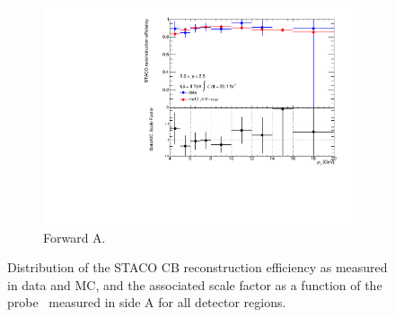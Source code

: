 \begin{figure}[htbp]
    \begin{subfigure}[b]{0.45\textwidth}
      \includegraphics[width=\textwidth]{PartCalibration2012/Plots/SFPlots/Forward_A_reco.pdf}
      \caption{Forward A.} \label{fig:CalibrationRecoSFForwardA}
    \end{subfigure}
    \caption{Distribution of the STACO CB reconstruction efficiency as measured in data and MC, and the associated scale factor as a function of the probe \pt\ measured in side A for all detector regions.}
  \label{fig:RecoEffSideA}
\end{figure}

